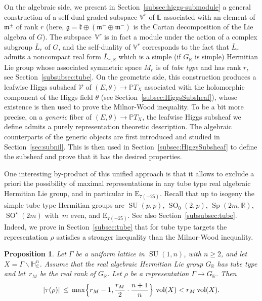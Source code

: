 \documentclass[10pt]{amsart}
\let\mathcal\mathscr
\theoremstyle{plain}
\newtheorem{propA}[theoA]{Proposition}
\theoremstyle{definition}
\let\ov\overline
\let\rgy r
\DeclareMathOperator{\SO}{SO}
\DeclareMathOperator{\SU}{SU}
\DeclareMathOperator{\Sp}{Sp}
\DeclareMathOperator{\vol}{vol}
\newcommand{\cV}{\mathcal{V}}
\newcommand{\bE}{\mathbb{E}}
\newcommand{\bR}{\mathbb{R}}
\newcommand{\HC}{{\mathbb{H}^n_\mathbb{C}}}
\newcommand{\PTX}{{\mathbb{P}T_X}}
\newcommand{\Vr}{\mathbb{V}^\rgy}
\newcommand{\fgg}{\mathfrak{g}}
\newcommand{\fk}{\mathfrak{k}}
\newcommand{\fm}{\mathfrak{m}}
\newcommand{\rkm}{{r_M}}
\begin{document}
On the algebraic side, we present in
Section~\ref{subsec:higgs-submodule} a general
construction of a self-dual graded subspace $\Vr$ of $\bE$ associated with an element of
$\fm^\pm$ of rank $r$ (here,
$\fgg = \fk \oplus (\fm^+ \oplus \fm^-)$ is the Cartan decomposition of the Lie algebra of
$G$). The subspace~$\Vr$ is in fact a module under the action of a complex subgroup $\ov{L}_r$
of $G$, and the self-duality of $\Vr$ corresponds to the fact that $\ov{L}_r$ admits a noncompact
real form $\ov{L}_{r,\bR}$ which is a simple (if $G_\bR$ is simple) Hermitian Lie group whose
associated symmetric space
$M_r$ is of \emph{tube type} and has rank $r$, see Section~\ref{subsubsec:tube}.
On the geometric side, this construction produces a leafwise
Higgs subsheaf $\cV$ of $(E,\theta)\to\PTX$ associated with the holomorphic component
of the Higgs field $\theta$ (see Section~\ref{subsec:HiggsSubsheaf}), whose existence is then used to
prove the
Milnor-Wood inequality. To be a bit more precise, on a \emph{generic} fiber of $(E,\theta)\to\PTX$, the
leafwise Higgs subsheaf we define admits a
purely representation theoretic description. The algebraic counterparts of the generic objects
are first introduced and studied in
Section~\ref{sec:subnil}. This is then used in Section~\ref{subsec:HiggsSubsheaf} to define the subsheaf
and prove that it has the desired properties.

One interesting by-product of this unified approach is that it allows to exclude a priori the
possibility of maximal representations in any tube type
real algebraic Hermitian Lie group, and in particular in $\mathrm{E}_{7(-25)}$. Recall
that up to isogeny the simple tube type
Hermitian groups are $\SU(p,p)$, $\SO_0(2,p)$, $\Sp(2m,\bR)$, $\SO^\star(2m)$ with~$m$ even,
and $\mathrm{E}_{7(-25)}$. See also Section~\ref{subsubsec:tube}. Indeed,
we prove in Section~\ref{subsec:tube} that for tube type targets
the representation $\rho$ satisfies a stronger inequality than the Milnor-Wood inequality.

\begin{propA}
\label{mainprop}
Let $\Gamma$ be a uniform lattice in $\SU(1,n)$, with $n\geq 2$, and let $X=\Gamma\backslash\HC$.
Assume that the real algebraic Hermitian Lie group $G_\bR$ has tube type and let~$\rkm$ be the real rank of $G_\bR$. Let $\rho$ be a
representation $\Gamma\to G_\bR$. Then
$$ |\tau(\rho)|\,\leq\, \max\Bigl\{{\rkm-1,\frac \rkm{2}\cdot \frac{n+1}{n}}\Bigr\}\,
\vol(X)<\rkm \vol(X).$$
\end{propA}
\end{document}
